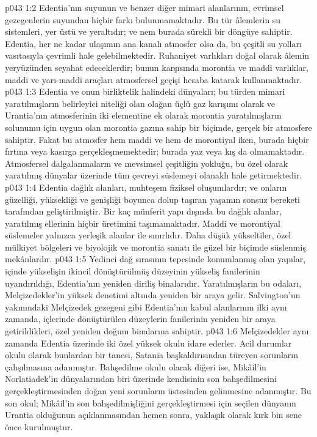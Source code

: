 \vs p043 1:2 Edentia’nın suyunun ve benzer diğer mimari alanlarının, evrimsel gezegenlerin suyundan hiçbir farkı bulunmamaktadır. Bu tür âlemlerin su sistemleri, yer üstü ve yeraltıdır; ve nem burada sürekli bir döngüye sahiptir. Edentia, her ne kadar ulaşımın ana kanalı atmosfer olsa da, bu çeşitli su yolları vasıtasıyla çevrimli hale gelebilmektedir. Ruhaniyet varlıkları doğal olarak âlemin yeryüzünden seyahat edeceklerdir; bunun karşısında morontia ve maddi varlıklar, maddi ve yarı\hyp{}maddi araçları atmosfersel geçişi hesaba katarak kullanmaktadır.
\vs p043 1:3 Edentia ve onun birliktelik halindeki dünyaları; bu türden mimari yaratılmışların belirleyici niteliği olan olağan üçlü gaz karışımı olarak ve Urantia’nın atmosferinin iki elementine ek olarak morontia yaratılmışların solunumu için uygun olan morontia gazına sahip bir biçimde, gerçek bir atmosfere sahiptir. Fakat bu atmosfer hem maddi ve hem de morontiyal iken, burada hiçbir fırtına veya kasırga gerçekleşmemektedir; burada yaz veya kış da olmamaktadır. Atmosfersel dalgalanmaların ve mevsimsel çeşitliğin yokluğu, bu özel olarak yaratılmış dünyalar üzerinde tüm çevreyi süslemeyi olanaklı hale getirmektedir.
\vs p043 1:4 Edentia dağlık alanları, muhteşem fiziksel oluşumlardır; ve onların güzelliği, yüksekliği ve genişliği boyunca dolup taşıran yaşamın sonsuz bereketi tarafından geliştirilmiştir. Bir kaç münferit yapı dışında bu dağlık alanlar, yaratılmış ellerinin hiçbir üretimini taşımamaktadır. Maddi ve morontiyal süslemeler yalnızca yerleşik alanlar ile sınırlıdır. Daha düşük yükseltiler, özel mülkiyet bölgeleri ve biyolojik ve morontia sanatı ile güzel bir biçimde süslenmiş mekânlardır.
\vs p043 1:5 Yedinci dağ sırasının tepesinde konumlanmış olan yapılar, içinde yükselişin ikincil dönüştürülmüş düzeyinin yükseliş fanilerinin uyandırıldığı, Edentia’nın yeniden diriliş binalarıdır. Yaratılmışların bu odaları, Melçizedekler’in yüksek denetimi altında yeniden bir araya gelir. Salvington’un yakınındaki Melçizedek gezegeni gibi Edentia’nın kabul alanlarının ilki aynı zamanda, içlerinde dönüştürülen düzeylerin fanilerinin yeniden bir araya getirildikleri, özel yeniden doğum binalarına sahiptir.
\vs p043 1:6 Melçizedekler aynı zamanda Edentia üzerinde iki özel yüksek okulu idare ederler. Acil durumlar okulu olarak bunlardan bir tanesi, Satania başkaldırısından türeyen sorunların çalışılmasına adanmıştır. Bahşedilme okulu olarak diğeri ise, Mikâil’in Norlatiadek’in dünyalarından biri üzerinde kendisinin son bahşedilmesini gerçekleştirmesinden doğan yeni sorunların üstesinden gelinmesine adanmıştır. Bu son okul; Mikâil’in son bahşedilmişliğini gerçekleştirmesi için seçilen dünyanın Urantia olduğunun açıklanmasından hemen sonra, yaklaşık olarak kırk bin sene önce kurulmuştur.
